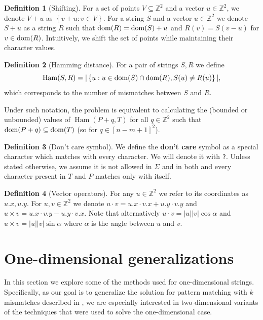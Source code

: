 \documentclass[11pt]{article}
\newcommand{\Z}{\mathbb{Z}}
\renewcommand{\phi}{\varphi}
\newcommand{\set}[1]{\left\lbrace #1 \right\rbrace}
\theoremstyle{plain}
\theoremstyle{definition}
\newtheorem{definition}{Definition}
\theoremstyle{remark}
\DeclareMathOperator*{\Ham}{Ham}
\begin{document}
\begin{definition}[Shifting]
	For a set of points $V \subseteq \Z^2$ and a vector $u \in \Z^2$, we denote $V + u$ as $\set{v + u : v \in V}$.
	For a string $S$ and a vector $u \in \Z^2$ we denote $S + u$ as a string $R$ such that
	$\operatorname*{dom}(R) = \operatorname*{dom}(S) + u$ and $R(v) = S(v - u)$ for $v \in \operatorname*{dom}(R)$.
	Intuitively, we shift the set of points while maintaining their character values.
\end{definition}


\begin{definition}[Hamming distance]
	For a pair of strings $S, R$ we define
	\[ \Ham(S, R) = |\set{u : u \in \d{S} \cap \d{R}, S(u) \neq R(u)}|,\]
	which corresponds to the number of mismatches between $S$ and $R$.
\end{definition}


Under such notation, the \HD problem is equivalent to calculating the (bounded or unbounded) values of $ \Ham(P + q, T) $
for all $q \in \Z^2$ such that $\operatorname*{dom}(P + q) \subseteq \operatorname*{dom}(T)$ (so for $q \in [n - m + 1]^2$).


\begin{definition}[Don't care symbol]
	We define the \textbf{don't care} symbol as a special character which matches with every character.
	We will denote it with \texttt{?}.
	Unless stated otherwise, we assume it is not allowed in $\Sigma$ and in both \hd and \HD every character present in $T$ and $P$ matches only with itself.
\end{definition}


\newcommand{\x}[1]{#1.x}
\newcommand{\y}[1]{#1.y}
\newcommand{\h}[1]{\phi \times #1}
\newcommand{\s}[1]{\psi \times #1}
\begin{definition}[Vector operators]
	For any $u \in \Z^2$ we refer to its coordinates as $\x{u}, \y{u}$.
	For $u, v \in \Z^2$ we denote $u \cdot v = \x{u} \cdot \x{v} + \y{u} \cdot \y{v}$
	and $u \times v = \x{u} \cdot \y{v} - \y{u} \cdot \x{v}$.
	Note that alternatively $u \cdot v = |u||v| \cos \alpha$ and $u \times v = |u||v| \sin \alpha$ where $\alpha$ is the angle between $u$ and $v$.
\end{definition}


\section{One-dimensional generalizations}
In this section we explore some of the methods used for one-dimensional strings.
Specifically, as our goal is to generalize the solution for pattern matching with $k$ mismatches described in \cite{Gawrychowski2017}, we are especially interested in two-dimensional variants of the techniques that were used to solve the one-dimensional case.
\end{document}
